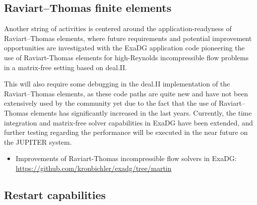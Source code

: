 \documentclass[a4paper,12pt]{article}
\begin{document}
\subsection{Raviart--Thomas finite elements}

Another string of activities is centered around the application-readyness of Raviart--Thomas elements, where future requirements and potential improvement opportunities are investigated with the ExaDG application code pioneering the use of Raviart-Thomas elements for high-Reynolds incompressible flow problems in a matrix-free setting based on deal.II.

This will also require some debugging in the deal.II implementation of the
Raviart--Thomas elements, as these code paths are quite new and have not been
extensively used by the community yet due to the fact that the use of
Raviart--Thomas elements has significantly increased in the last
years. Currently, the time integration and matrix-free solver capabilities in
ExaDG have been extended, and further testing regarding the performance will
be executed in the near future on the JUPITER system.
\begin{itemize}
\item Improvements of Raviart-Thomas incompressible flow solvers in ExaDG:\\
  \href{https://github.com/kronbichler/exadg/tree/martin}{https://github.com/kronbichler/exadg/tree/martin}
\end{itemize}

\subsection{Restart capabilities}
\end{document}
